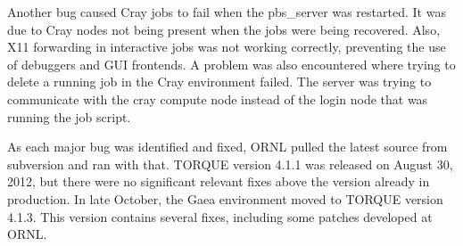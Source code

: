 Another bug caused Cray jobs to fail when the pbs_server was restarted.  It was
due to Cray nodes not being present when the jobs were being recovered.  Also,
X11 forwarding in interactive jobs was not working correctly, preventing the
use of debuggers and GUI frontends.  A problem was also encountered where
trying to delete a running job in the Cray environment failed.  The server was
trying to communicate with the cray compute node instead of the login node that
was running the job script.

As each major bug was identified and fixed, ORNL pulled the latest source from
subversion and ran with that.  TORQUE version 4.1.1 was released on August 30,
2012, but there were no significant relevant fixes above the version already in
production.  In late October, the Gaea environment moved to TORQUE version
4.1.3.  This version contains several fixes, including some patches developed
at ORNL.
